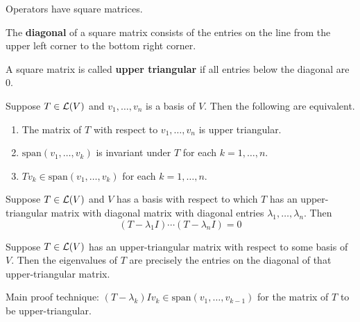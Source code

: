 \documentclass{extarticle}
\begin{document}
\begin{remark}
    Operators have square matrices.
\end{remark}

\begin{definition}
    The \textbf{diagonal} of a square matrix consists of the entries on the line from the upper left 
    corner to the bottom right corner. 
\end{definition}

\begin{definition}
    A square matrix is called \textbf{upper triangular} if all entries below the diagonal are 0.
\end{definition}

\begin{thm}
    Suppose \(T \in \mathcal{L}(V)\) and \(v_1, \ldots, v_n\) is a basis of \(V\). Then the following are 
    equivalent. 
    \begin{enumerate}[label=(\alph*)]
        \item The matrix of \(T\) with respect to \(v_1, \ldots, v_n\) is upper triangular. 
        \item \(\text{span}(v_1, \ldots, v_k)\) is invariant under \(T\) for each \(k = 1, \ldots, n\). 
        \item \(Tv_k \in \text{span}(v_1, \ldots, v_k)\) for each \(k = 1, \ldots, n\). 
    \end{enumerate}
\end{thm}

\begin{lemma}
    Suppose \(T \in \mathcal{L}(V)\) and \(V\) has a basis with respect to which \(T\) has an upper-triangular matrix 
    with diagonal matrix with diagonal entries \(\lambda_1, \ldots, \lambda_n\). Then 
    \[(T - \lambda_1 I) \cdots (T - \lambda_n I) = 0\]
\end{lemma}

\begin{thm}
    Suppose \(T \in \mathcal{L}(V)\) has an upper-triangular matrix with respect to some 
    basis of \(V\). Then the eigenvalues of \(T\) are precisely the entries on the diagonal 
    of that upper-triangular matrix. 
\end{thm}

\begin{remark}
    Main proof technique: \((T - \lambda_k)I v_k \in \text{span}(v_1, \ldots, v_{k-1})\) for the matrix 
    of \(T\) to be upper-triangular. 
\end{remark}
\end{document}
